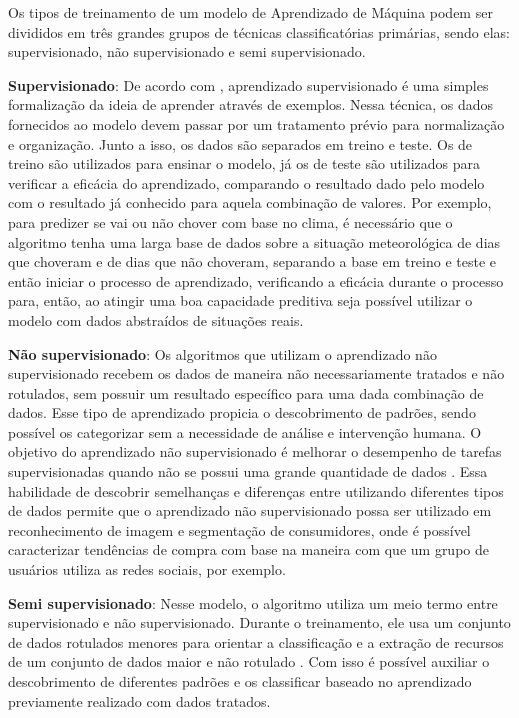 Os tipos de treinamento de um modelo de Aprendizado de Máquina podem
ser divididos em três grandes grupos de técnicas classificatórias
primárias, sendo elas: supervisionado, não supervisionado e semi
supervisionado.

\textbf{Supervisionado}: De acordo com , aprendizado
supervisionado é uma simples formalização da ideia de aprender através
de exemplos. Nessa técnica, os dados fornecidos ao modelo devem passar
por um tratamento prévio para normalização e organização. Junto a
isso, os dados são separados em treino e teste. Os de treino são
utilizados para ensinar o modelo, já os de teste são utilizados para
verificar a eficácia do aprendizado, comparando o resultado dado pelo
modelo com o resultado já conhecido para aquela combinação de
valores. Por exemplo, para predizer se vai ou não chover com base no
clima, é necessário que o algoritmo tenha uma larga base de dados
sobre a situação meteorológica de dias que choveram e de dias que não
choveram, separando a base em treino e teste e então iniciar o
processo de aprendizado, verificando a eficácia durante o processo
para, então, ao atingir uma boa capacidade preditiva seja possível
utilizar o modelo com dados abstraídos de situações reais.

\textbf{Não supervisionado}: Os algoritmos que utilizam o aprendizado não
supervisionado recebem os dados de maneira não necessariamente
tratados e não rotulados, sem possuir um resultado específico para uma
dada combinação de dados. Esse tipo de aprendizado propicia o
descobrimento de padrões, sendo possível os categorizar sem a
necessidade de análise e intervenção humana. O objetivo do aprendizado
não supervisionado é melhorar o desempenho de tarefas supervisionadas
quando não se possui uma grande quantidade de dados
\cite{sutskever2015}. Essa habilidade de descobrir semelhanças e
diferenças entre utilizando diferentes tipos de dados permite que o
aprendizado não supervisionado possa ser utilizado em reconhecimento
de imagem e segmentação de consumidores, onde é possível caracterizar
tendências de compra com base na maneira com que um grupo de usuários
utiliza as redes sociais, por exemplo.

\textbf{Semi supervisionado}: Nesse modelo, o algoritmo utiliza um meio termo
entre supervisionado e não supervisionado. Durante o treinamento, ele
usa um conjunto de dados rotulados menores para orientar a
classificação e a extração de recursos de um conjunto de dados maior e
não rotulado \cite{uibm2022}. Com isso é possível auxiliar o
descobrimento de diferentes padrões e os classificar baseado no
aprendizado previamente realizado com dados tratados.

